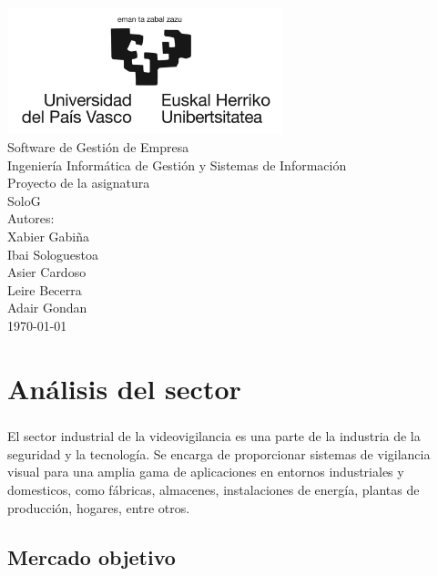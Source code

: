 \documentclass{report}
\begin{document}
    \begin{titlepage}
        \centering
        \includegraphics[width=0.6\textwidth]{./img/logo.jpg}\\
        \vspace{1cm}
        \LARGE Software de Gestión de Empresa\\
        \vspace{0.5cm}
        \Large Ingeniería Informática de Gestión y Sistemas de Información\\
        \vspace{3cm}
        \Huge Proyecto de la asignatura\\
        \huge SoloG\\
        \vspace{2.5cm}
        \Large Autores:\\
        \vspace{0.2cm}
        \large Xabier Gabiña\\
        \large Ibai Sologuestoa\\
        \large Asier Cardoso\\
        \large Leire Becerra\\
        \large Adair Gondan\\
        \vfill
        \today
    \end{titlepage}
    \tableofcontents
    \listoffigures
    \listoftables
    \chapter{Análisis del sector}
      \paragraph*{}{El sector industrial de la videovigilancia es una parte de la industria de la seguridad y la tecnología. Se encarga de proporcionar sistemas de vigilancia visual para una amplia gama de aplicaciones en entornos industriales y domesticos, como fábricas, almacenes, instalaciones de energía, plantas de producción, hogares, entre otros.}
      \section{Mercado objetivo}
\end{document}
